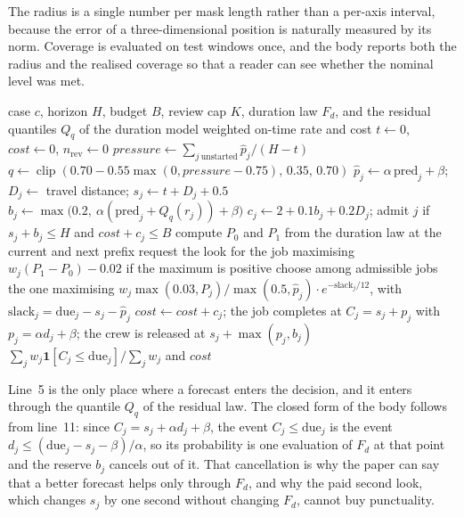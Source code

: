 The radius is a single number per mask length rather than a per-axis interval, because the
error of a three-dimensional position is naturally measured by its norm. Coverage is evaluated
on test windows once, and the body reports both the radius and the realised coverage so that a
reader can see whether the nominal level was met.

\begin{algorithm}[H]
\caption{Reserve, closed-form punctuality, and dispatch (Part III)}
\label{alg:p3}
\begin{algorithmic}[1]
\Require case $c$, horizon $H$, budget $B$, review cap $K$, duration law $F_d$, and the
residual quantiles $Q_q$ of the duration model
\Ensure weighted on-time rate and cost
\State $t\gets 0$, $\mathit{cost}\gets 0$, $n_{\text{rev}}\gets 0$
  \State $\mathit{pressure}\gets \sum_{j\ \text{unstarted}}\hat{p}_j/(H-t)$
  \State $q\gets\operatorname{clip}(0.70-0.55\max(0,\mathit{pressure}-0.75),\,0.35,\,0.70)$
    \State $\hat{p}_j\gets\alpha\,\mathrm{pred}_j+\beta$; $D_j\gets$ travel distance;
    $s_j\gets t+D_j+0.5$
    \State $b_j\gets\max\!\big(0.2,\ \alpha(\mathrm{pred}_j+Q_q(r_j))+\beta\big)$
    \State $c_j\gets 2+0.1b_j+0.2D_j$; admit $j$ if $s_j+b_j\le H$ and $\mathit{cost}+c_j\le B$
  \EndFor
    \State compute $P_0$ and $P_1$ from the duration law at the current and next prefix
    \State request the look for the job maximising $w_j(P_1-P_0)-0.02$ if the maximum is positive
  \EndIf
  \State choose among admissible jobs the one maximising
  $w_j\max(0.03,P_j)/\max(0.5,\hat{p}_j)\cdot e^{-\mathrm{slack}_j/12}$,
  with $\mathrm{slack}_j=\mathrm{due}_j-s_j-\hat{p}_j$
  \State $\mathit{cost}\gets\mathit{cost}+c_j$; the job completes at $C_j=s_j+p_j$ with
  $p_j=\alpha d_j+\beta$; the crew is released at $s_j+\max(p_j,b_j)$
\EndWhile
\State \Return $\sum_j w_j\mathbf{1}[C_j\le\mathrm{due}_j]/\sum_j w_j$ and $\mathit{cost}$
\end{algorithmic}
\end{algorithm}

Line~5 is the only place where a forecast enters the decision, and it enters through the
quantile $Q_q$ of the residual law. The closed form of the body follows from line~11: since
$C_j=s_j+\alpha d_j+\beta$, the event $C_j\le\mathrm{due}_j$ is the event
$d_j\le(\mathrm{due}_j-s_j-\beta)/\alpha$, so its probability is one evaluation of $F_d$ at that
point and the reserve $b_j$ cancels out of it. That cancellation is why the paper can say that a
better forecast helps only through $F_d$, and why the paid second look, which changes
$s_j$ by one second without changing $F_d$, cannot buy punctuality.

